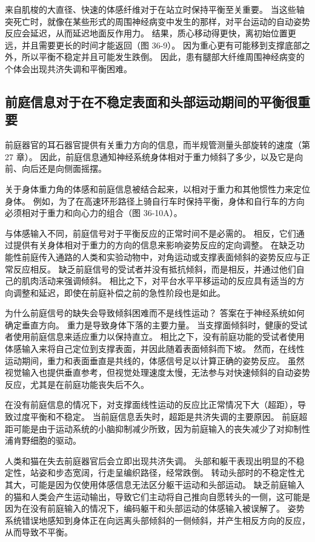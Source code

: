 来自肌梭的大直径、快速的体感纤维对于在站立时保持平衡至关重要。 当这些轴突死亡时，就像在某些形式的周围神经病变中发生的那样，对平台运动的自动姿势反应会延迟，从而延迟地面反作用力。 结果，质心移动得更快，离初始位置更远，并且需要更长的时间才能返回（图 36-9）。 因为重心更有可能移到支撑底部之外，所以平衡不稳定并且可能发生跌倒。 因此，患有腿部大纤维周围神经病变的个体会出现共济失调和平衡困难。

\subsection{前庭信息对于在不稳定表面和头部运动期间的平衡很重要}

前庭器官的耳石器官提供有关重力方向的信息，而半规管测量头部旋转的速度（第 27 章）。 因此，前庭信息通知神经系统身体相对于重力倾斜了多少，以及它是向前、向后还是向侧面摇摆。

关于身体重力角的体感和前庭信息被结合起来，以相对于重力和其他惯性力来定位身体。 例如，为了在高速环形路径上骑自行车时保持平衡，身体和自行车的方向必须相对于重力和向心力的组合（图 36-10A）。

与体感输入不同，前庭信号对于平衡反应的正常时间不是必需的。 相反，它们通过提供有关身体相对于重力的方向的信息来影响姿势反应的定向调整。 在缺乏功能性前庭传入通路的人类和实验动物中，对角运动或支撑表面倾斜的姿势反应与正常反应相反。 缺乏前庭信号的受试者并没有抵抗倾斜，而是相反，并通过他们自己的肌肉活动来强调倾斜。 相比之下，对平台水平平移运动的反应具有适当的方向调整和延迟，即使在前庭补偿之前的急性阶段也是如此。

为什么前庭信号的缺失会导致倾斜困难而不是线性运动？ 答案在于神经系统如何确定垂直方向。 重力是导致身体下落的主要力量。 当支撑面倾斜时，健康的受试者使用前庭信息来适应重力以保持直立。 相比之下，没有前庭功能的受试者使用体感输入来将自己定位到支撑表面，并因此随着表面倾斜而下坡。 然而，在线性运动期间，重力和表面垂直是共线的，体感信号足以计算正确的姿势反应。 虽然视觉输入也提供垂直参考，但视觉处理速度太慢，无法参与对快速倾斜的自动姿势反应，尤其是在前庭功能丧失后不久。

在没有前庭信息的情况下，对支撑面线性运动的反应比正常情况下大（超距），导致过度平衡和不稳定。 当前庭信息丢失时，超距是共济失调的主要原因。 前庭超距可能是由于运动系统的小脑抑制减少所致，因为前庭输入的丧失减少了对抑制性浦肯野细胞的驱动。

人类和猫在失去前庭器官后会立即出现共济失调。 头部和躯干表现出明显的不稳定性，站姿和步态宽阔，行走呈编织路径，经常跌倒。 转动头部时的不稳定性尤其大，可能是因为仅使用体感信息无法区分躯干运动和头部运动。 缺乏前庭输入的猫和人类会产生运动输出，导致它们主动将自己推向自愿转头的一侧，这可能是因为在没有前庭输入的情况下，编码躯干和头部运动的体感输入被误解了。 姿势系统错误地感知到身体正在向远离头部倾斜的一侧倾斜，并产生相反方向的反应，从而导致不平衡。

